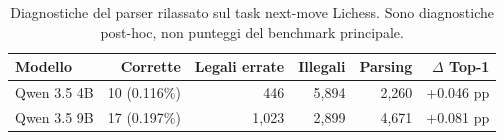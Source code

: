 \begin{table}[H]
    \centering
    \small
    \caption{Diagnostiche del parser rilassato sul task next-move Lichess. Sono diagnostiche post-hoc, non punteggi del benchmark principale.}
    \label{tab:llm-relaxed-diagnostics}
    
    \begin{tabularx}{\textwidth}{>{\raggedright\arraybackslash}Xrrrrr}
        \toprule
        Modello & Corrette & Legali errate & Illegali & Parsing & \(\Delta\) Top-1 \\
        \midrule
        Qwen 3.5 4B & 10 (0.116\%) & 446 & 5,894 & 2,260 & +0.046 pp \\
        Qwen 3.5 9B & 17 (0.197\%) & 1,023 & 2,899 & 4,671 & +0.081 pp \\
        \bottomrule
    \end{tabularx}
\end{table}

